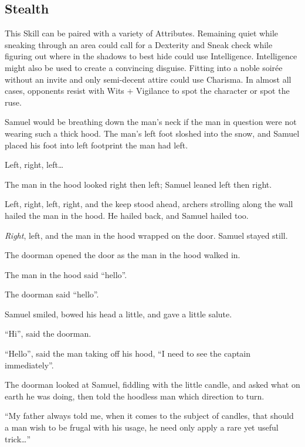 \begin{multicols}{2}
\begin{exampletext}
\end{exampletext}

\subsection{Stealth}

This Skill can be paired with a variety of Attributes.
Remaining quiet while sneaking through an area could call for a Dexterity and Sneak check while figuring out where in the shadows to best hide could use Intelligence.
Intelligence might also be used to create a convincing disguise.
Fitting into a noble soir\'{e}e without an invite and only semi-decent attire could use Charisma.
In almost all cases, opponents resist with Wits + Vigilance to spot the character or spot the ruse.

\begin{exampletext}
  Samuel would be breathing down the man's neck if the man in question were not wearing such a thick hood.
  The man's left foot sloshed into the snow, and Samuel placed his foot into left footprint the man had left.

  Left, right, left\ldots

  The man in the hood looked right then left; Samuel leaned left then right.

  Left, right, left, right, and the keep stood ahead, archers strolling along the wall hailed the man in the hood.
  He hailed back, and Samuel hailed too.

  \emph{Right}, left, and the man in the hood wrapped on the door.
  Samuel stayed still.

  The doorman opened the door as the man in the hood walked in.

  The man in the hood said ``hello''.

  The doorman said ``hello''.

  Samuel smiled, bowed his head a little, and gave a little salute.

  ``Hi'', said the doorman.

  ``Hello'', said the man taking off his hood, ``I need to see the captain immediately''.

  The doorman looked at Samuel, fiddling with the little candle, and asked what on earth he was doing, then told the hoodless man which direction to turn.

  ``My father always told me, when it comes to the subject of candles, that should  a man wish to be frugal with his usage, he need only apply a rare yet useful trick\ldots''


\end{exampletext}
\end{multicols}
